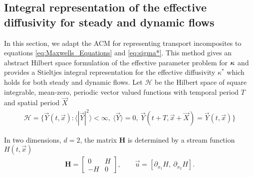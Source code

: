 \documentclass[11pt]{amsart}
\newcommand{\Hb}{\mathbf{H}}
\newcommand\bkappa{\mbox{\boldmath${\kappa}$}}
\begin{document}
\subsection{Integral representation of the effective diffusivity for
  steady and dynamic flows}\label{sec:Integral_Rep}
%
In this section, we adapt the ACM for representing transport
incomposites \cite{Golden:CMP-473} to equations \eqref{eq:Maxwells_Equations} and
\eqref{eq:sigma*}. This method gives an abstract Hilbert space formulation
of the effective parameter problem for $\bkappa$ and provides a
Stieltjes integral representation for the effective diffusivity $\kappa^*$
which holds for both steady and dynamic flows. Let $\mathscr{H}$ be
the Hilbert space of square integrable, mean-zero, periodic vector valued
functions with temporal period $T$ and spatial period $\vec{X}$
%
\begin{align}
  \mathscr{H}=\{\vec{Y}(t,\vec{x}):\langle|\vec{Y}|^2\rangle<\infty, \ \langle\vec{Y}\rangle=0, \
  \vec{Y}(t+T,\vec{x}+\vec{X})=\vec{Y}(t,\vec{x})\} 
\end{align}
%




In two dimensions, $d=2$, the matrix $\Hb$ is determined by a stream
function $H(t,\vec{x})$ 
%
\begin{align}\label{eq:u_H}  
  \Hb=\left[
  \begin{array}{cc}
    0  & H\\
    -H & 0
  \end{array}
  \right],
  \qquad
  \vec{u}=[\partial_{x_1}H, \ \partial_{x_2}H].
\end{align}
%

\newpage
\end{document}
